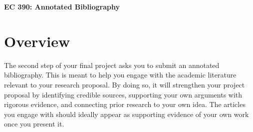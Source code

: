 \documentclass[11pt]{article}
\begin{document}
\thispagestyle{fancy}
\selectfont

\begin{center}
\textbf{\huge EC 390: Annotated Bibliography}\\  
\end{center}

\section*{Overview}

The second step of your final project asks you to submit an annotated bibliography. 
This is meant to help you engage with the academic literature relevant to your research proposal. 
By doing so, it will strengthen your project proposal by identifying credible sources, supporting your own arguments with rigorous evidence, and connecting prior research to your own idea. 
The articles you engage with should ideally appear as supporting evidence of your own work once you present it. 
\end{document}
